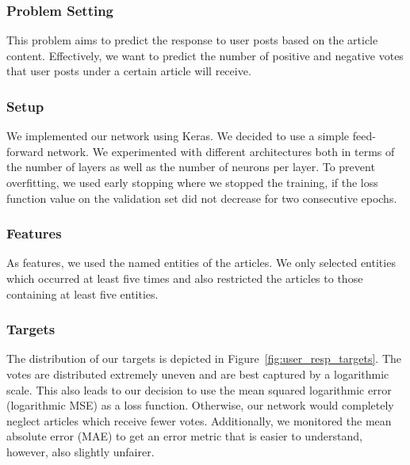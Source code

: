 \documentclass[acmsmall]{acmart}
\begin{document}
\subsubsection{Problem Setting}
This problem aims to predict the response to user posts based on the article content. Effectively, we want to predict the number of positive and negative votes that user posts under a certain article will receive. 

\subsubsection{Setup}
We implemented our network using Keras. We decided to use a simple feed-forward network. We experimented with different architectures both in terms of the number of layers as well as the number of neurons per layer. To prevent overfitting, we used early stopping where we stopped the training, if the loss function value on the validation set did not decrease for two consecutive epochs. 

\subsubsection{Features}
As features, we used the named entities of the articles. We only selected entities which occurred at least five times and also restricted the articles to those containing at least five entities. 

\subsubsection{Targets}
The distribution of our targets is depicted in Figure~\ref{fig:user_resp_targets}. The votes are distributed extremely uneven and are best captured by a logarithmic scale. This also leads to our decision to use the mean squared logarithmic error (logarithmic MSE) as a loss function. Otherwise, our network would completely neglect articles which receive fewer votes. Additionally, we monitored the mean absolute error (MAE) to get an error metric that is easier to understand, however, also slightly unfairer.  
\end{document}
